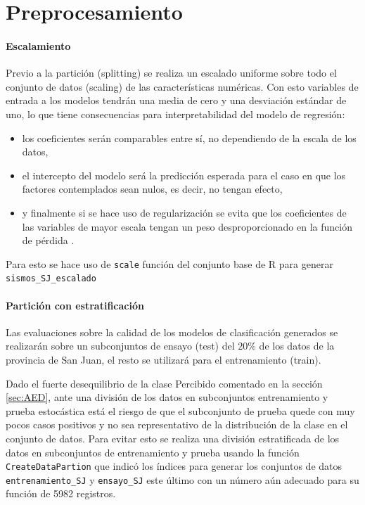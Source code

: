 \documentclass[a4paper]{report}
\begin{document}
\section{Preprocesamiento}





\paragraph{Escalamiento}
Previo a la partición (splitting) se realiza un escalado uniforme sobre todo el conjunto de datos (scaling) de las características numéricas.
Con esto variables de entrada a los modelos tendrán una media de cero y una desviación estándar de uno, lo que tiene consecuencias para interpretabilidad del modelo de regresión:
\begin{itemize}
	\item los coeficientes serán comparables entre sí, no dependiendo de la escala de los datos,
	\item el intercepto del modelo será la predicción esperada para el caso en que los factores contemplados sean nulos, es decir, no tengan efecto,
	\item y finalmente si se hace uso de regularización se evita que los coeficientes de las variables de mayor escala tengan un peso desproporcionado en la función de pérdida \cite[sección 3.4.1]{hastie_elements_2009}.
\end{itemize}
Para esto se hace uso de \verb'scale' función del conjunto base de R para generar \verb'sismos_SJ_escalado' 


\paragraph{Partición con estratificación}
Las evaluaciones sobre la calidad de los modelos de clasificación generados se realizarán sobre un subconjuntos de ensayo (test) del \(20 \%\) de los datos de la provincia de San Juan, el resto se utilizará para el entrenamiento (train).

Dado el fuerte desequilibrio de la clase Percibido comentado en la sección \ref{sec:AED}, ante una división de los datos en subconjuntos entrenamiento y prueba estocástica está el riesgo de que el subconjunto de prueba quede con muy pocos casos positivos y no sea representativo de la distribución de la clase en el conjunto de datos. 
Para evitar esto se realiza una división estratificada de los datos en subconjuntos de entrenamiento y prueba usando la función \verb'CreateDataPartion' que indicó los índices para generar los conjuntos de datos \verb'entrenamiento_SJ' y \verb'ensayo_SJ' este último con un número aún adecuado para su función de \num{5982} registros.
\end{document}
